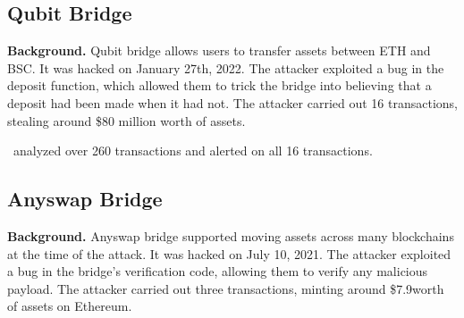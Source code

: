 \subsection{Qubit Bridge}
\textbf{Background.} Qubit bridge allows users to transfer assets between ETH and BSC. It was hacked on January 27th, 2022. The attacker exploited a bug in the deposit function, which allowed them to trick the bridge into believing that a deposit had been made when it had not. The attacker carried out 16 transactions, stealing around \$80 million worth of assets.

 \offlinetool~analyzed over 260 transactions and alerted on all 16 transactions. 



\subsection{Anyswap Bridge}
\textbf{Background.} Anyswap bridge supported moving assets across many blockchains at the time of the attack. It was hacked on July 10, 2021. The attacker exploited a bug in the bridge's verification code, allowing them to verify any malicious payload. The attacker carried out three transactions, minting around \$7.9\mil worth of assets on Ethereum.


